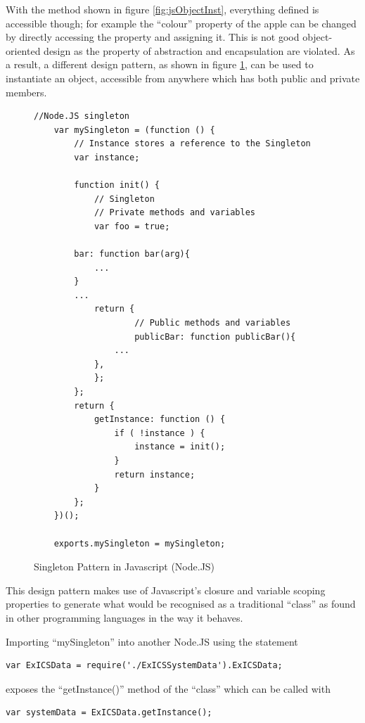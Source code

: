 With the method shown in figure \ref{fig:jsObjectInst}, everything defined is accessible though; for example the ``colour'' property of the apple can be changed by directly accessing the property and assigning it.  This is not good object-oriented design as the property of abstraction and encapsulation are violated.  As a result, a different design pattern, as shown in figure \ref{fig:nodeJSsingleton}, can be used to instantiate an object, accessible from anywhere which has both public and private members.

\begin{figure}
	\lstset{language=JavaScript}
	\begin{lstlisting}[tabsize=2,
			breaklines=true]
	//Node.JS singleton
	var mySingleton = (function () {
		// Instance stores a reference to the Singleton
		var instance;

		function init() {
			// Singleton
			// Private methods and variables
			var foo = true;

		bar: function bar(arg){
			...
		}
		...
			return {
					// Public methods and variables
					publicBar: function publicBar(){
				...
			},	
			};
		};
		return {
			getInstance: function () {
				if ( !instance ) {
					instance = init();
				}
				return instance;
			}
		};
	})();

	exports.mySingleton = mySingleton;
	\end{lstlisting}
	\caption{Singleton Pattern in Javascript (Node.JS)}
	\label{fig:nodeJSsingleton}
\end{figure}

This design pattern makes use of Javascript's closure and variable scoping properties to generate what would be recognised as a traditional ``class'' as found in other programming languages in the way it behaves.

\FloatBarrier

Importing ``mySingleton'' into another Node.JS using the statement

\FloatBarrier

\lstset{language=JavaScript}
\begin{lstlisting}[tabsize=2,
		breaklines=true]
	var ExICSData = require('./ExICSSystemData').ExICSData;
\end{lstlisting}

\FloatBarrier

exposes the ``getInstance()'' method of the ``class'' which can be called with

\FloatBarrier

\lstset{language=JavaScript}
\begin{lstlisting}[tabsize=2,
		breaklines=true]
	var systemData = ExICSData.getInstance();
\end{lstlisting}

